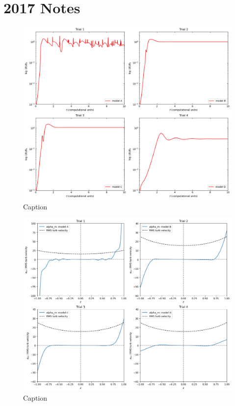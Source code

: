 \documentclass[a4paper,10pt]{article}
\newcommand{\1}{_\mathrm{1}}					   	%
\newcommand{\2}{_\mathrm{2}}					   	%
\begin{document}
\section{2017 Notes}
\begin{figure}
    \centering
    \includegraphics[width=\linewidth]{B_strength_avg_vs_time_subplots.png}
    \caption{Caption}
    \label{fig:enter-label}
\end{figure}

\begin{figure}
    \centering
    \includegraphics[width=\linewidth]{alpha_m_and_turb_vel_vs_z_subplots.png}
    \caption{Caption}
    \label{fig:enter-label}
\end{figure}
\end{document}

